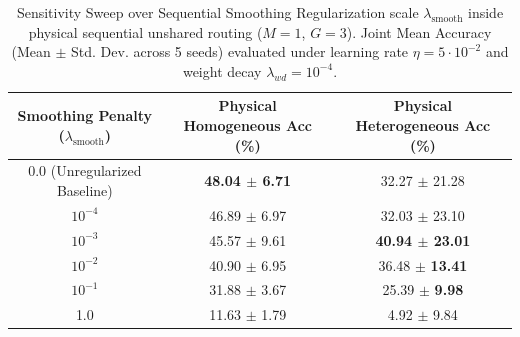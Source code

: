 \begin{table}[t]
\caption{Sensitivity Sweep over Sequential Smoothing Regularization scale $\lambda_{\text{smooth}}$ inside physical sequential unshared routing ($M=1$, $G=3$). Joint Mean Accuracy (Mean $\pm$ Std. Dev. across 5 seeds) evaluated under learning rate $\eta = 5 \cdot 10^{-2}$ and weight decay $\lambda_{wd} = 10^{-4}$.}
\label{tab:smoothing_results}
\vskip 0.15in
\begin{center}
\begin{small}
\begin{tabular}{ccc}
\toprule
\textbf{Smoothing Penalty ($\lambda_{\text{smooth}}$)} & \textbf{Physical Homogeneous Acc (\%)} & \textbf{Physical Heterogeneous Acc (\%)} \\
\midrule
0.0 (Unregularized Baseline) & \textbf{48.04 $\pm$ 6.71} & 32.27 $\pm$ 21.28 \\
$10^{-4}$                    & 46.89 $\pm$ 6.97 & 32.03 $\pm$ 23.10 \\
$10^{-3}$                    & 45.57 $\pm$ 9.61 & \textbf{40.94 $\pm$ 23.01} \\
$10^{-2}$                    & 40.90 $\pm$ 6.95 & 36.48 $\pm$ \textbf{13.41} \\
$10^{-1}$                    & 31.88 $\pm$ 3.67 & 25.39 $\pm$ \textbf{9.98} \\
1.0                          & 11.63 $\pm$ 1.79 & 4.92 $\pm$ 9.84 \\
\bottomrule
\end{tabular}
\end{small}
\end{center}
\vskip -0.1in
\end{table}

